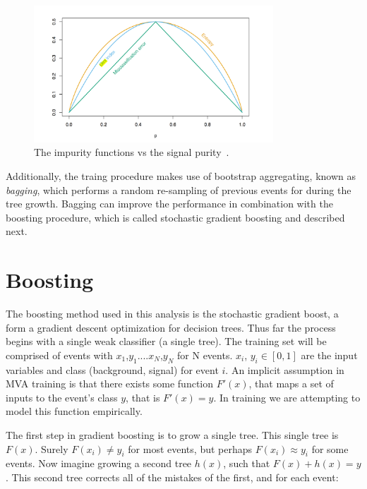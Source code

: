 \begin{figure}[hbtp]
 \begin{center}
   \includegraphics[width=0.8\textwidth]{ap2_figs/misclass_plot.pdf}
   \caption[Plot of misclassifcation impurity functions.]{The impurity functions vs the signal purity~\cite{esii}.}
   \label{fig:misclass_plot}
 \end{center}
\end{figure}

Additionally, the traing procedure makes use of bootstrap aggregating, known as \textit{bagging}, which performs a random re-sampling of previous events for during the tree growth.
Bagging can improve the performance in combination with the boosting procedure, which is called stochastic gradient boosting and described next.  


\section{Boosting}
The boosting method used in this analysis is the stochastic gradient boost, a form a gradient descent optimization for decision trees. Thus far the process begins with a single
weak classifier (a single tree). The training set will be comprised of events with {$x_{1}$,$y_{1}$}....{$x_{N}$,$y_{N}$} for N events. $x_{i}$, $y_{i} \in [0,1]$
are the input variables and class (background, signal) for event $i$. An implicit assumption in MVA training is that there exists
some function $F'(x)$, that maps a set of inputs to the event's class $y$, that is $F'(x) = y$. In training we are attempting to model this function empirically. 

The first step in gradient boosting is to grow a single tree. This single tree is $F(x)$. Surely $F(x_{i}) \neq y_{i}$ for most events, but perhaps $F(x_{i}) \approx y_{i}$
for some events. Now imagine growing a second tree $h(x)$, such that $F(x) + h(x) = y$. This second tree corrects all of the mistakes of the first, and for each event:

